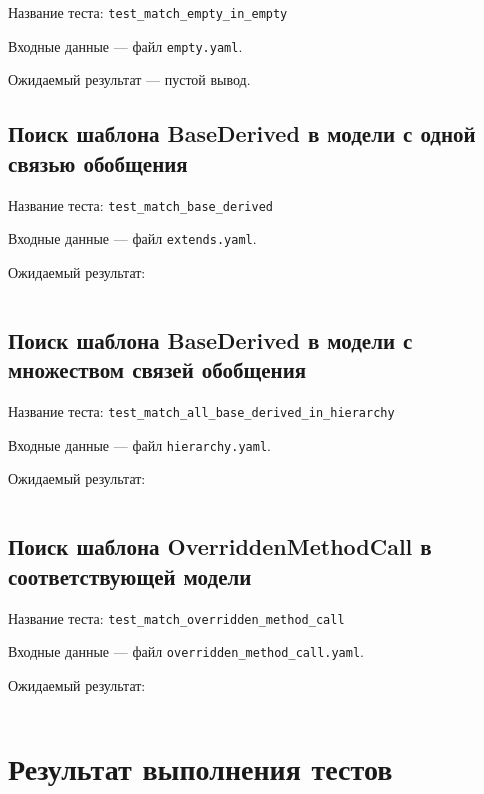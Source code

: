 Название теста: \verb;test_match_empty_in_empty;

Входные данные --- файл \verb;empty.yaml;.

Ожидаемый результат --- пустой вывод.

\subsection*{Поиск шаблона BaseDerived в модели с одной связью обобщения}

Название теста: \verb;test_match_base_derived;

Входные данные --- файл \verb;extends.yaml;.

Ожидаемый результат:

\inputminted{text}{../src/test/data/match/base_derived_in_extends.log}

\subsection*{Поиск шаблона BaseDerived в модели с множеством связей обобщения}

Название теста: \verb;test_match_all_base_derived_in_hierarchy;

Входные данные --- файл \verb;hierarchy.yaml;.

Ожидаемый результат:

\inputminted{text}{../src/test/data/match/all_base_derived_in_hierarchy.log}

\subsection*{Поиск шаблона OverriddenMethodCall в соответствующей модели}

Название теста: \verb;test_match_overridden_method_call;

Входные данные --- файл \verb;overridden_method_call.yaml;.

Ожидаемый результат:

\inputminted{text}{../src/test/data/match/overridden_method_call.log}

\section*{Результат выполнения тестов}

\inputminted{text}{inc/match_pattern_test.log}
